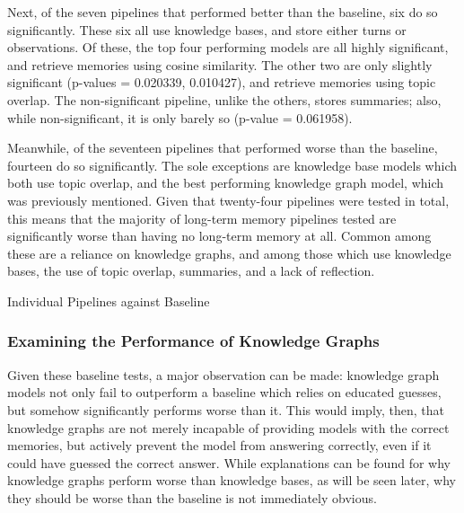 Next, of the seven pipelines that performed better than the baseline, six do so significantly. These six all use knowledge bases, and store either turns or observations. Of these, the top four performing models are all highly significant, and retrieve memories using cosine similarity. The other two are only slightly significant (p-values = 0.020339, 0.010427), and retrieve memories using topic overlap. The non-significant pipeline, unlike the others, stores summaries; also, while non-significant, it is only barely so (p-value = 0.061958). 

Meanwhile, of the seventeen pipelines that performed worse than the baseline, fourteen do so significantly. The sole exceptions are knowledge base models which both use topic overlap, and the best performing knowledge graph model, which was previously mentioned. Given that twenty-four pipelines were tested in total, this means that the majority of long-term memory pipelines tested are significantly worse than having no long-term memory at all. Common among these are a reliance on knowledge graphs, and among those which use knowledge bases, the use of topic overlap, summaries, and a lack of reflection.

\begin{table}
\centering
\scriptsize

\caption{Individual Pipelines against Baseline}
\label{tab:individual_pipelines_against_baseline_table}
\end{table}


\subsubsection{Examining the Performance of Knowledge Graphs}

Given these baseline tests, a major observation can be made: knowledge graph models not only fail to outperform a baseline which relies on educated guesses, but somehow significantly performs worse than it. This would imply, then, that knowledge graphs are not merely incapable of providing models with the correct memories, but actively prevent the model from answering correctly, even if it could have guessed the correct answer. While explanations can be found for why knowledge graphs perform worse than knowledge bases, as will be seen later, why they should be worse than the baseline is not immediately obvious. 


